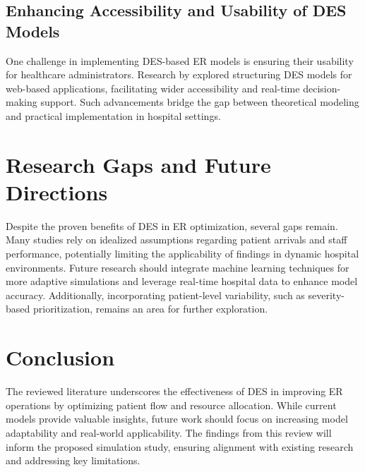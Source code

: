 \documentclass{article}
\begin{document}
\subsection{Enhancing Accessibility and Usability of DES Models}
One challenge in implementing DES-based ER models is ensuring their usability for healthcare administrators. Research by \cite{monks2023} explored structuring DES models for web-based applications, facilitating wider accessibility and real-time decision-making support. Such advancements bridge the gap between theoretical modeling and practical implementation in hospital settings.

\section{Research Gaps and Future Directions}
Despite the proven benefits of DES in ER optimization, several gaps remain. Many studies rely on idealized assumptions regarding patient arrivals and staff performance, potentially limiting the applicability of findings in dynamic hospital environments. Future research should integrate machine learning techniques for more adaptive simulations and leverage real-time hospital data to enhance model accuracy. Additionally, incorporating patient-level variability, such as severity-based prioritization, remains an area for further exploration.

\section{Conclusion}
The reviewed literature underscores the effectiveness of DES in improving ER operations by optimizing patient flow and resource allocation. While current models provide valuable insights, future work should focus on increasing model adaptability and real-world applicability. The findings from this review will inform the proposed simulation study, ensuring alignment with existing research and addressing key limitations.
\end{document}
